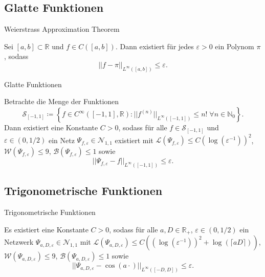 \documentclass[10pt,aspectratio=169]{beamer}
\newcommand{\N}{\mathbb{N}} %
\newcommand{\R}{\mathbb{R}} %
\begin{document}
\subsection{Glatte Funktionen}

\begin{frame}{Weierstrass Approximation Theorem} %
    \begin{theorem}
        Sei \([a,b] \subset \R\) und \(f\in C([a,b])\). Dann existiert für jedes \(\varepsilon > 0\) ein 
        Polynom \(\pi\), sodass 
        \[ ||f - \pi ||_{L^\infty([a,b])} \leq \varepsilon. \]
    \end{theorem}
\end{frame}

\begin{frame}{Glatte Funktionen}
    \begin{lemma} %
        Betrachte die Menge der Funktionen 
        \[ \mathcal{S}_{[-1,1]} \coloneqq \left\{ f \in C^\infty([-1,1], \R): ||f^{(n)}||_{L^\infty([-1,1])} \leq n! \;\forall n \in \N_0 \right\}. \]
        Dann existiert eine Konstante \(C>0\), sodass für alle \(f\in \mathcal{S}_{[-1,1]}\) und \(\varepsilon\in (0,1/2)\) 
        ein Netz \(\Psi_{f,\varepsilon} \in \mathcal{N}_{1,1}\) existiert mit 
        \( \mathcal{L}(\Psi_{f,\varepsilon}) \leq C(\log(\varepsilon^{-1}))^2 \), 
        \(\mathcal{W}(\Psi_{f,\varepsilon}) \leq 9\), \(\mathcal{B}(\Psi_{f,\varepsilon}) \leq 1\) 
        sowie 
        \[ ||\Psi_{f,\varepsilon} - f||_{L^\infty([-1,1])} \leq \varepsilon. \]
    \end{lemma}
\end{frame}

\subsection{Trigonometrische Funktionen}

\begin{frame}{Trigonometrische Funktionen}
    \begin{theorem} %
        \newcommand{\Psia}{\Psi_{a,D,\varepsilon}}
        Es existiert eine Konstante \(C>0\), sodass für alle \(a,D\in \R_+\), \(\varepsilon \in (0,1/2)\) 
        ein Netzwerk \(\Psia \in \mathcal{N}_{1,1}\) mit \(\mathcal{L}(\Psia) \leq C((\log(\varepsilon^{-1}))^2 + \log(\lceil aD\rceil))\), 
        \(\mathcal{W}(\Psia) \leq 9\), \(\mathcal{B}(\Psia) \leq 1\) sowie 
        \[ ||\Psia - \cos(a \cdot) ||_{L^{\infty}([-D,D])} \leq \varepsilon. \]
    \end{theorem}
\end{frame}
\end{document}
